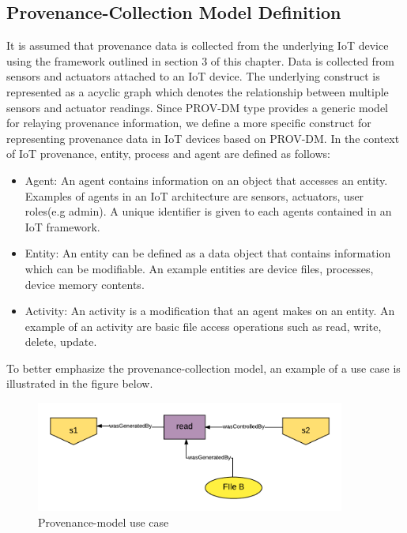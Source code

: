 \subsection{Provenance-Collection Model Definition}

It is assumed that provenance data is collected from the underlying IoT device using the framework outlined in section 3 of this chapter. Data is collected from sensors and actuators attached to an IoT device. The underlying construct is represented as a acyclic graph which denotes the relationship between multiple sensors and actuator readings. Since PROV-DM type provides a generic model for relaying provenance information, we define a more specific construct for representing provenance data in IoT devices based on  PROV-DM. In the context of IoT provenance, entity, process and agent are defined as follows:

\begin{itemize}

\item Agent: An agent contains information on an object that accesses an entity. Examples of agents in an IoT architecture are sensors, actuators, user roles(e.g admin). A unique identifier is given to each agents contained in an IoT framework.

\item Entity:  An entity can be defined as a data object that contains information which can be modifiable. An example entities are device files, processes, device memory contents.

\item Activity: An activity is a modification that an agent makes on an entity. An example of an activity are basic file access operations such as read, write, delete, update. 


\end{itemize}


To better emphasize the provenance-collection model, an example of a use case is illustrated in the figure below.



\begin{figure}[h]
\begin{center}

\includegraphics[width=4.0in]{provenance_model.png}    
\end{center}
\caption{Provenance-model use case}
\label{autom}
\end{figure}





